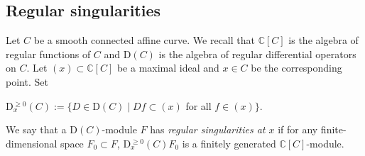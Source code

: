 \documentclass[12pt]{amsart}
\theoremstyle{definition}\newtheorem{theorem}{Theorem}[section]
\theoremstyle{definition}\newtheorem{definition}[proposition]{Definition}
\theoremstyle{remark}\newtheorem{example}[proposition]{Example}
\begin{document}
\subsection{Regular singularities}\label{SSrs} Let $C$ be a smooth connected affine curve. We recall that $\mathbb C[C]$ is the algebra of regular functions of $C$ and D$(C)$ is the algebra of regular differential operators on $C$. Let $(x)\subset\mathbb C[C]$ be a maximal ideal and $x\in C$ be the corresponding point. Set\begin{center}D$^{\ge0}_x(C):=\{D\in$D$(C)\mid Df\subset (x)$ for all $f\in (x)\}$.\end{center}We say that a D$(C)$-module $F$ has {\it regular singularities at $x$} if for any finite-dimensional space $F_0\subset F$, D$^{\ge0}_x(C)F_0$ is a finitely generated $\mathbb C[C]$-module.
\end{document}
